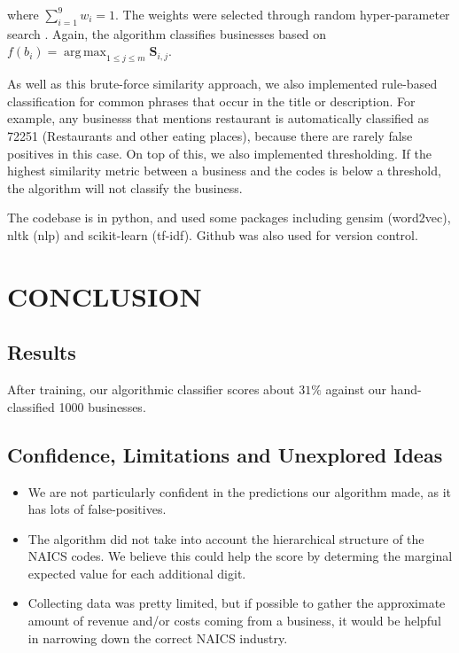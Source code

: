 \documentclass[letterpaper, 9 pt, conference]{IEEEtran}
\DeclareMathOperator*{\argmax}{arg\,max}
\newcommand{\matr}[1]{\mathbf{#1}}
\begin{document}
where $\sum_{i=1}^9 w_i=1$. The weights were selected through random hyper-parameter search \cite{random}. Again, the algorithm classifies businesses based on 
$f(b_i) = \argmax_{1 \leq j \leq m} \matr{S}_{i,j}.$

As well as this brute-force similarity approach, we also implemented rule-based classification for common phrases that occur in the title or description. For example, any businesss that mentions restaurant is automatically classified as 72251 (Restaurants and other eating places), because there are rarely false positives in this case. On top of this, we also implemented thresholding. If the highest similarity metric between a business and the codes is below a threshold, the algorithm will not classify the business.

The codebase is in python, and used some packages including gensim (word2vec), nltk (nlp) and scikit-learn (tf-idf). Github was also used for version control.

\section{CONCLUSION}

\subsection{Results}

After training, our algorithmic classifier scores about $31\%$ against our hand-classified 1000 businesses.

\subsection{Confidence, Limitations and Unexplored Ideas}

\begin{itemize}
\item We are not particularly confident in the predictions our algorithm made, as it has lots of false-positives.
\item The algorithm did not take into account the hierarchical structure of the NAICS codes. We believe this could help the score by determing the marginal expected value for each additional digit.
\item Collecting data was pretty limited, but if possible to gather the approximate amount of revenue and/or costs coming from a business, it would be helpful in narrowing down the correct NAICS industry.
\end{itemize}
\end{document}
